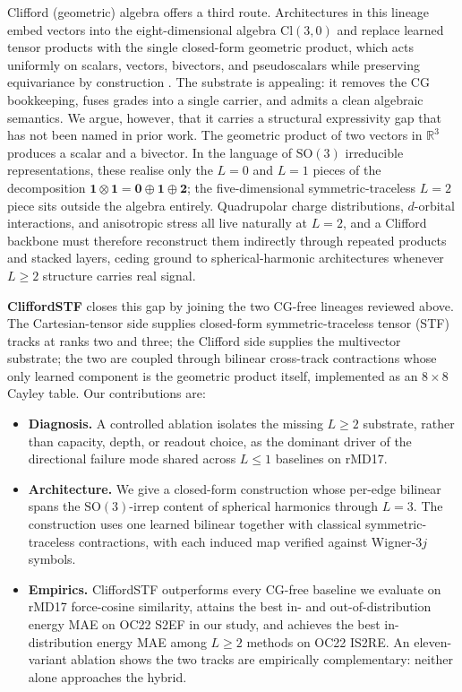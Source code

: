 Clifford (geometric) algebra offers a third route. Architectures in this lineage embed vectors into the eight-dimensional algebra $\mathrm{Cl}(3,0)$ and replace learned tensor products with the single closed-form geometric product, which acts uniformly on scalars, vectors, bivectors, and pseudoscalars while preserving equivariance by construction \citep{ruhe2023cgenn,ruhe2023gcan,brehmer2023geometric,brandstetter2022clifford}. The substrate is appealing: it removes the CG bookkeeping, fuses grades into a single carrier, and admits a clean algebraic semantics. We argue, however, that it carries a structural expressivity gap that has not been named in prior work. The geometric product of two vectors in $\mathbb{R}^3$ produces a scalar and a bivector. In the language of $\mathrm{SO}(3)$ irreducible representations, these realise only the $L{=}0$ and $L{=}1$ pieces of the decomposition $\mathbf{1} \otimes \mathbf{1} = \mathbf{0} \oplus \mathbf{1} \oplus \mathbf{2}$; the five-dimensional symmetric-traceless $L{=}2$ piece sits outside the algebra entirely. Quadrupolar charge distributions, $d$-orbital interactions, and anisotropic stress all live naturally at $L{=}2$, and a Clifford backbone must therefore reconstruct them indirectly through repeated products and stacked layers, ceding ground to spherical-harmonic architectures whenever $L{\geq}2$ structure carries real signal.

\textbf{CliffordSTF} closes this gap by joining the two CG-free lineages reviewed above. The Cartesian-tensor side supplies closed-form symmetric-traceless tensor (STF) tracks at ranks two and three; the Clifford side supplies the multivector substrate; the two are coupled through bilinear cross-track contractions whose only learned component is the geometric product itself, implemented as an $8 \times 8$ Cayley table. Our contributions are:
\begin{itemize}
    \item \textbf{Diagnosis.} A controlled ablation isolates the missing $L \geq 2$ substrate, rather than capacity, depth, or readout choice, as the dominant driver of the directional failure mode shared across $L \leq 1$ baselines on rMD17.
    \item \textbf{Architecture.} We give a closed-form construction whose per-edge bilinear spans the $\mathrm{SO}(3)$-irrep content of spherical harmonics through $L{=}3$. The construction uses one learned bilinear together with classical symmetric-traceless contractions, with each induced map verified against Wigner-$3j$ symbols.
    \item \textbf{Empirics.} CliffordSTF outperforms every CG-free baseline we evaluate on rMD17 force-cosine similarity, attains the best in- and out-of-distribution energy MAE on OC22 S2EF in our study, and achieves the best in-distribution energy MAE among $L \geq 2$ methods on OC22 IS2RE. An eleven-variant ablation shows the two tracks are empirically complementary: neither alone approaches the hybrid.
\end{itemize}
